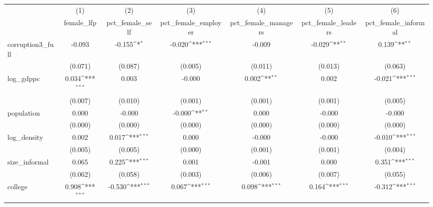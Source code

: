 {
\def\sym#1{\ifmmode^{#1}\else\(^{#1}\)\fi}
\begin{tabular}{l*{6}{c}}
\hline\hline
            &\multicolumn{1}{c}{(1)}&\multicolumn{1}{c}{(2)}&\multicolumn{1}{c}{(3)}&\multicolumn{1}{c}{(4)}&\multicolumn{1}{c}{(5)}&\multicolumn{1}{c}{(6)}\\
            &\multicolumn{1}{c}{female\_lfp}&\multicolumn{1}{c}{pct\_female\_self}&\multicolumn{1}{c}{pct\_female\_employer}&\multicolumn{1}{c}{pct\_female\_managers}&\multicolumn{1}{c}{pct\_female\_leaders}&\multicolumn{1}{c}{pct\_female\_informal}\\
\hline
corruption3\_full&      -0.093         &      -0.155\sym{*}  &      -0.020\sym{***}&      -0.009         &      -0.029\sym{**} &       0.139\sym{**} \\
            &     (0.071)         &     (0.087)         &     (0.005)         &     (0.011)         &     (0.013)         &     (0.063)         \\
[1em]
log\_gdppc   &       0.034\sym{***}&       0.003         &      -0.000         &       0.002\sym{**} &       0.002         &      -0.021\sym{***}\\
            &     (0.007)         &     (0.010)         &     (0.001)         &     (0.001)         &     (0.001)         &     (0.005)         \\
[1em]
population  &       0.000         &      -0.000         &      -0.000\sym{**} &       0.000         &      -0.000         &      -0.000         \\
            &     (0.000)         &     (0.000)         &     (0.000)         &     (0.000)         &     (0.000)         &     (0.000)         \\
[1em]
log\_density &       0.002         &       0.017\sym{***}&       0.000         &      -0.000         &      -0.000         &      -0.010\sym{***}\\
            &     (0.005)         &     (0.005)         &     (0.000)         &     (0.001)         &     (0.001)         &     (0.004)         \\
[1em]
size\_informal&       0.065         &       0.225\sym{***}&       0.001         &      -0.001         &       0.000         &       0.351\sym{***}\\
            &     (0.062)         &     (0.058)         &     (0.003)         &     (0.006)         &     (0.007)         &     (0.055)         \\
[1em]
college     &       0.908\sym{***}&      -0.530\sym{***}&       0.067\sym{***}&       0.098\sym{***}&       0.164\sym{***}&      -0.312\sym{***}\\

\end{tabular}}
